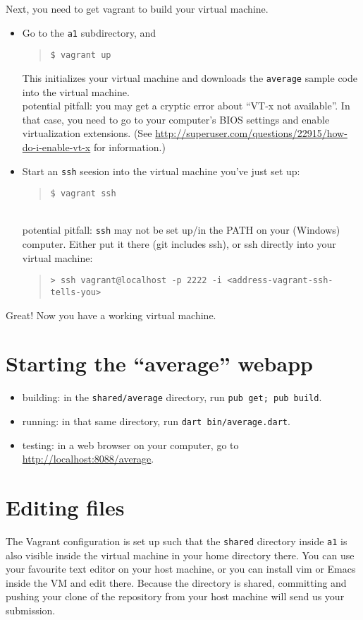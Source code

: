 \documentclass[10pt,hidelinks]{article}
\begin{document}
Next, you need to get vagrant to build your virtual machine.
\begin{itemize}
\item Go to the {\tt a1} subdirectory, and
  \begin{quote}
    \verb+$ vagrant up+
  \end{quote}
  This initializes your virtual machine and downloads the {\tt average} sample code into the virtual machine. \\
  potential pitfall: you may get a cryptic error about ``VT-x not available''. In that case, you need to go to your computer's BIOS settings and enable virtualization extensions. (See \url{http://superuser.com/questions/22915/how-do-i-enable-vt-x} for information.)
\item Start an {\tt ssh} seesion into the virtual machine you've just set up:
  \begin{quote}
    \verb+$ vagrant ssh+
  \end{quote} ~\\[-1em]
  potential pitfall: {\tt ssh} may not be set up/in the PATH on your (Windows) computer. Either put it there (git includes ssh), or ssh directly into your virtual machine:
  \begin{quote}
    \verb+> ssh vagrant@localhost -p 2222 -i <address-vagrant-ssh-tells-you>+
  \end{quote}
\end{itemize}
Great! Now you have a working virtual machine.

\section*{Starting the ``average'' webapp}
\begin{itemize}
\item building: in the {\tt shared/average} directory, run {\tt pub get; pub build}.
\item running: in that same directory, run {\tt dart bin/average.dart}.
\item testing: in a web browser on your computer, go to \url{http://localhost:8088/average}.
\end{itemize}

\section*{Editing files}
The Vagrant configuration is set up such that the {\tt shared} directory inside 
{\tt a1} is also visible inside the virtual machine in your home directory there.
You can use your favourite text editor on your host machine, or you can install
vim or Emacs inside the VM and edit there. Because the directory is shared, committing
and pushing your clone of the repository from your host machine will send us your submission.
\end{document}
